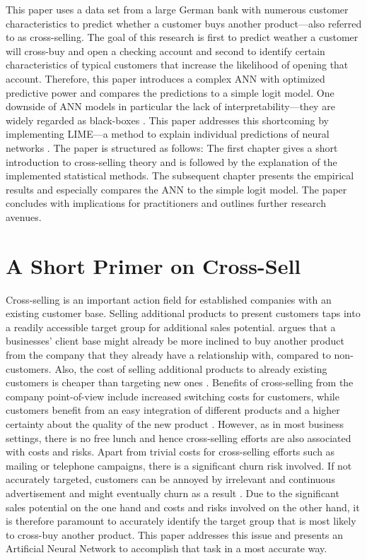 \documentclass[12pt,a4paper]{article}
\begin{document}
This paper uses a data set from a large German bank with numerous customer characteristics to predict whether a customer buys another
product---also referred to as cross-selling.
The goal of this research is first to predict weather a customer will cross-buy and open a checking account and second to identify certain characteristics of typical customers that increase the likelihood of opening that account.
Therefore, this paper introduces a complex ANN with optimized predictive power and compares the predictions to a simple logit model.
One downside of ANN models in particular the lack of interpretability---they are widely regarded as black-boxes \citep{benitezAreArtificialNeural1997, dayhoffArtificialNeuralNetworks2001}.
This paper addresses this shortcoming by implementing LIME---a method to explain individual predictions of neural networks \citep{ribeiroWhyShouldTrust2016a}.
The paper is structured as follows: The first chapter gives a short introduction to cross-selling theory and is followed by the explanation of the implemented statistical methods.
The subsequent chapter presents the empirical results and especially compares the ANN to the simple logit model.
The paper concludes with implications for practitioners and outlines further research avenues.

\section{A Short Primer on Cross-Sell}
Cross-selling is an important action field for established companies with an existing customer base.
Selling additional products to present customers taps into a readily accessible target group for additional sales potential.
\cite{felveyCrosssellingComputer1982} argues that a businesses' client base might already be more inclined to buy another product from the company that they already have a relationship with, compared to non-customers.
Also, the cost of selling additional products to already existing customers is cheaper than targeting new ones \citep{reichheldZeroDefectionsQuality1990}.
Benefits of cross-selling from the company point-of-view include increased switching costs for customers, while customers benefit from an easy integration
of different products and a higher certainty about the quality of the new product \citep{kamakuraApplyingLatentTrait1991, kamakuraCrosssellingDatabaseMarketing2003}. 
However, as in most business settings, there is no free lunch and hence cross-selling efforts are also associated with costs and risks.
Apart from trivial costs for cross-selling efforts such as mailing or telephone campaigns, there is a significant churn risk involved.
If not accurately targeted, customers can be annoyed by irrelevant and continuous advertisement and might eventually churn as a result \citep{keaveneyCustomerSwitchingBehavior1995}.
Due to the significant sales potential on the one hand and costs and risks involved on the other hand, it is therefore paramount to accurately identify the target group that is most likely to cross-buy another product.
This paper addresses this issue and presents an Artificial Neural Network to accomplish that task in a most accurate way.
\end{document}
